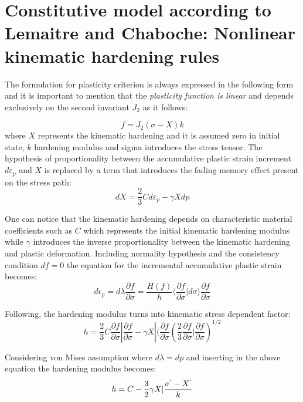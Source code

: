 \documentclass[12pt,a4paper]{report}
\begin{document}
\section{Constitutive model according to Lemaitre and Chaboche: Nonlinear kinematic hardening rules }

The formulation for plasticity criterion is always expressed in the following form and it is important to mention that the\textit{ plasticity function is linear} and depends exclusively on the second invariant $J_2$ as it follows:

\begin{equation}
	f=J_2(\sigma-X)k
\end{equation}
where $X$ represents the kinematic hardening and it is assumed zero in initial state, $k$ hardening modulus and sigma introduces the stress tensor. The hypothesis of proportionality between the accumulative plastic strain increment $d\varepsilon_p$ and $X$ is replaced by a term that introduces the fading memory effect present on the stress path:
\begin{equation}
	dX=\frac{2}{3}Cd\varepsilon_p - \gamma Xdp
\end{equation}

One can notice that the kinematic hardening depends on characteristic material coefficients such as $C$ which represents the initial kinematic hardening modulus while $\gamma$ introduces the inverse proportionality between the kinematic hardening and plastic deformation. Including normality hypothesis and the consistency condition $df=0$ the equation for the incremental accumulative plastic strain becomes:
\begin{equation}
	d\epsilon_p=d\lambda\frac{\partial f}{\partial \sigma}=\frac{H(f)}{h}\langle\frac{\partial f}{\partial \sigma}|d\sigma \rangle \frac{\partial f}{\partial\sigma}
\end{equation}

Following, the hardening modulus turns into kinematic stress dependent factor:
\begin{equation}
	h=\frac{2}{3}C \frac{\partial f}{\partial\sigma}|\frac{\partial f}{\partial\sigma} - \gamma X | (\frac{\partial f}{\partial\sigma}(\frac{2}{3}\frac{\partial f}{\partial\sigma}|\frac{\partial f}{\partial\sigma})^{1/2}
\end{equation}

Considering von Mises assumption where $d\lambda =dp$ and inserting in the above equation the hardening modulus becomes:
\begin{equation}
h=C-\frac{3}{2}\gamma X|\frac{\sigma^` - X^`}{k}
\end{equation}
\end{document}
